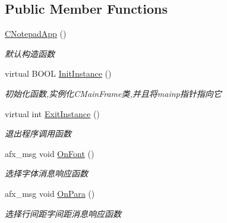 \subsection*{Public Member Functions}
\begin{DoxyCompactItemize}
\item 
\mbox{\label{class_c_notepad_app_a829ed77997eb81496b815b50657ecb40}} 
\hyperlink{class_c_notepad_app_a829ed77997eb81496b815b50657ecb40}{C\+Notepad\+App} ()
\begin{DoxyCompactList}\small\item\em 默认构造函数 \end{DoxyCompactList}\item 
\mbox{\label{class_c_notepad_app_a31874d4fcf2e5120379146e61d8716d4}} 
virtual B\+O\+OL \hyperlink{class_c_notepad_app_a31874d4fcf2e5120379146e61d8716d4}{Init\+Instance} ()
\begin{DoxyCompactList}\small\item\em 初始化函数,实例化\+C\+Main\+Frame类,并且将mainp指针指向它 \end{DoxyCompactList}\item 
\mbox{\label{class_c_notepad_app_a07647790b646bc0be54fbf39e069ddcd}} 
virtual int \hyperlink{class_c_notepad_app_a07647790b646bc0be54fbf39e069ddcd}{Exit\+Instance} ()
\begin{DoxyCompactList}\small\item\em 退出程序调用函数 \end{DoxyCompactList}\item 
afx\+\_\+msg void \hyperlink{class_c_notepad_app_aa09334de95a65c56cdca8a682b006bb6}{On\+Font} ()
\begin{DoxyCompactList}\small\item\em 选择字体消息响应函数~\newline
\end{DoxyCompactList}\item 
afx\+\_\+msg void \hyperlink{class_c_notepad_app_a954649ecbb87fb8a001f2ed399440261}{On\+Para} ()
\begin{DoxyCompactList}\small\item\em 选择行间距字间距消息响应函数~\newline
\end{DoxyCompactList}\item 
\mbox{\label{class_c_notepad_app_a66c1b4a1e235017e0a5078438df97e7c}} 

\end{DoxyCompactItemize}
